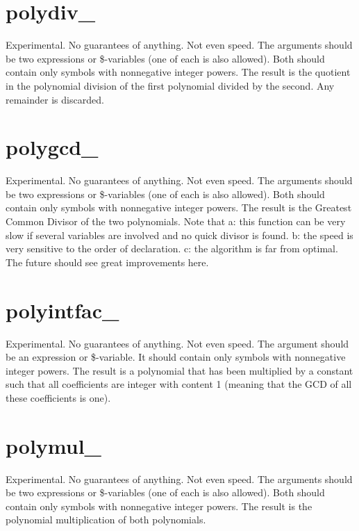 \section{polydiv\_}
\label{funpolydiv}
\noindent Experimental. No guarantees of anything. Not even speed. 
The arguments should be two expressions or 
\$-variables (one of each is 
also allowed). Both should contain only symbols with nonnegative integer 
powers. The result is the quotient in the polynomial division of the first 
polynomial divided by the second. Any remainder is discarded.

\section{polygcd\_}
\label{funpolygcd}
\noindent Experimental. No guarantees of anything. Not even speed. The 
arguments should be two expressions or 
\$-variables (one of each is also allowed). Both should 
contain only symbols with nonnegative integer powers. The result is the 
Greatest Common Divisor of the two polynomials. Note that a: this function 
can be very slow if several variables are involved and no quick divisor is 
found. b: the speed is very sensitive to the order of declaration. c: the 
algorithm is far from optimal. The future should see great improvements 
here.

\section{polyintfac\_}
\label{funpolyfac}
\noindent Experimental. No guarantees of anything. Not even speed. The 
argument should be an expression or 
\$-variable.
It should contain only symbols with nonnegative integer powers. The result 
is a polynomial that has been multiplied by a constant such that all 
coefficients are integer with content 1 (meaning that the GCD of all these 
coefficients is one).

\section{polymul\_}
\label{funpolymul}
\noindent Experimental. No guarantees of anything. Not even speed. The 
arguments should be two expressions or 
\$-variables (one of each is also allowed). Both should 
contain only symbols with nonnegative integer powers. The result is the 
polynomial multiplication of both polynomials.

